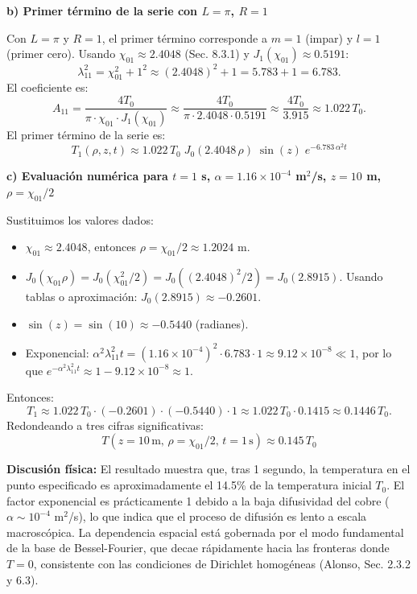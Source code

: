 \documentclass[a4paper]{article}
\begin{document}
\textbf{b) Primer término de la serie con $L=\pi$, $R=1$}

Con $L=\pi$ y $R=1$, el primer término corresponde a $m=1$ (impar) y $l=1$ (primer cero). Usando $\chi_{01} \approx 2.4048$ (Sec. 8.3.1) y $J_1(\chi_{01}) \approx 0.5191$:
$$\lambda_{11}^2 = \chi_{01}^2 + 1^2 \approx (2.4048)^2 + 1 = 5.783 + 1 = 6.783.$$
El coeficiente es:
$$A_{11} = \frac{4T_0}{\pi \cdot \chi_{01} \cdot J_1(\chi_{01})} \approx \frac{4T_0}{\pi \cdot 2.4048 \cdot 0.5191} \approx \frac{4T_0}{3.915} \approx 1.022\,T_0.$$
El primer término de la serie es:
$$\boxed{T_1(\rho,z,t) \approx 1.022\,T_0 \; J_0(2.4048\,\rho) \; \sin(z) \; e^{-6.783\,\alpha^2 t}}$$

\textbf{c) Evaluación numérica para $t=1$ s, $\alpha = 1.16\times 10^{-4}$ m$^2$/s, $z=10$ m, $\rho = \chi_{01}/2$}

Sustituimos los valores dados:
\begin{itemize}
\item $\chi_{01} \approx 2.4048$, entonces $\rho = \chi_{01}/2 \approx 1.2024$ m.
\item $J_0(\chi_{01}\rho) = J_0(\chi_{01}^2/2) = J_0((2.4048)^2/2) = J_0(2.8915)$. Usando tablas o aproximación: $J_0(2.8915) \approx -0.2601$.
\item $\sin(z) = \sin(10) \approx -0.5440$ (radianes).
\item Exponencial: $\alpha^2\lambda_{11}^2 t = (1.16\times 10^{-4})^2 \cdot 6.783 \cdot 1 \approx 9.12\times 10^{-8} \ll 1$, por lo que $e^{-\alpha^2\lambda_{11}^2 t} \approx 1 - 9.12\times 10^{-8} \approx 1$.
\end{itemize}
Entonces:
$$T_1 \approx 1.022\,T_0 \cdot (-0.2601) \cdot (-0.5440) \cdot 1 \approx 1.022\,T_0 \cdot 0.1415 \approx 0.1446\,T_0.$$
Redondeando a tres cifras significativas:
$$\boxed{T(z=10\,\text{m},\,\rho=\chi_{01}/2,\,t=1\,\text{s}) \approx 0.145\,T_0}$$

\textbf{Discusión física:} El resultado muestra que, tras 1 segundo, la temperatura en el punto especificado es aproximadamente el 14.5\% de la temperatura inicial $T_0$. El factor exponencial es prácticamente 1 debido a la baja difusividad del cobre ($\alpha \sim 10^{-4}$ m$^2$/s), lo que indica que el proceso de difusión es lento a escala macroscópica. La dependencia espacial está gobernada por el modo fundamental de la base de Bessel-Fourier, que decae rápidamente hacia las fronteras donde $T=0$, consistente con las condiciones de Dirichlet homogéneas (Alonso, Sec. 2.3.2 y 6.3).
\end{document}
